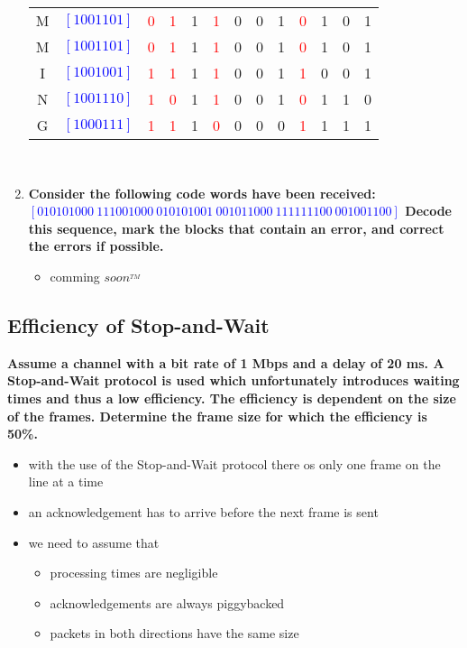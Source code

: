 \documentclass[a4paper,12pt]{article}
\begin{document}
\begin{enumerate}[itemsep=0pt]
\begin{tabular}{c|c|ccccccccccc}
			M & \textcolor{blue}{$[1001101]$} & \textcolor{red}{0} & \textcolor{red}{1} & 1 & \textcolor{red}{1} & 0 & 0 & 1 & \textcolor{red}{0} & 1 & 0 & 1 \\
			M & \textcolor{blue}{$[1001101]$} & \textcolor{red}{0} & \textcolor{red}{1} & 1 & \textcolor{red}{1} & 0 & 0 & 1 & \textcolor{red}{0} & 1 & 0 & 1 \\
			I & \textcolor{blue}{$[1001001]$} & \textcolor{red}{1} & \textcolor{red}{1} & 1 & \textcolor{red}{1} & 0 & 0 & 1 & \textcolor{red}{1} & 0 & 0 & 1 \\
			N & \textcolor{blue}{$[1001110]$} & \textcolor{red}{1} & \textcolor{red}{0} & 1 & \textcolor{red}{1} & 0 & 0 & 1 & \textcolor{red}{0} & 1 & 1 & 0 \\
			G & \textcolor{blue}{$[1000111]$}  & \textcolor{red}{1} & \textcolor{red}{1} & 1 & \textcolor{red}{0} & 0 & 0 & 0 & \textcolor{red}{1} & 1 & 1 & 1 \\
		\end{tabular}
	\\
		\item \textbf{Consider the following code words have been received:	\\
		\textcolor{blue}{$[010101000~ 111001000~ 010101001~ 001011000~ 111111100~ 001001100]$} 
		Decode  this  sequence,  mark  the  blocks  that  contain  an  error,  and  correct  the  errors  if possible.}
		\begin{itemize}[itemsep=0pt]
			\item comming $soon^{_{TM}}$
		\end{itemize}
	\end{enumerate}
	
	
	
	\subsection{Efficiency of Stop-and-Wait}
	\textbf{Assume a channel with a bit rate of 1 Mbps and a delay of 20 ms.  A Stop-and-Wait protocol is used which unfortunately introduces waiting times and thus a low efficiency.  The efficiency is dependent on the size of the frames.  Determine the frame size for which the efficiency is 50\%.}\\
	
	\begin{itemize}[itemsep=0pt]
		\item with the use of the Stop-and-Wait protocol there os only one frame on the line at a time
		\item an acknowledgement has to arrive before the next frame is sent
		\item we need to assume that
		\begin{itemize}[itemsep=0pt]
			\item processing times are negligible 
			\item acknowledgements are always piggybacked
			\item packets in both directions have the same size
		\end{itemize}
	\end{itemize}
\end{document}
